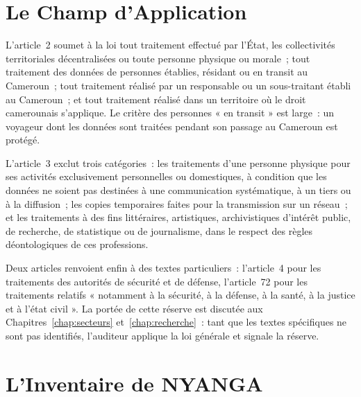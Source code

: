 \section{Le Champ d'Application}
\label{sec:c01-champ}

L'article~2 soumet à la loi tout traitement effectué par l'État, les
collectivités territoriales décentralisées ou toute personne physique ou
morale~; tout traitement des données de personnes établies, résidant ou en
transit au Cameroun~; tout traitement réalisé par un responsable ou un
sous-traitant établi au Cameroun~; et tout traitement réalisé dans un
territoire où le droit camerounais s'applique. Le critère des personnes
« en transit » est large~: un voyageur dont les données sont traitées
pendant son passage au Cameroun est protégé.

L'article~3 exclut trois catégories~: les traitements d'une personne
physique pour ses activités exclusivement personnelles ou domestiques, à
condition que les données ne soient pas destinées à une communication
systématique, à un tiers ou à la diffusion~; les copies temporaires faites
pour la transmission sur un réseau~; et les traitements à des fins
littéraires, artistiques, archivistiques d'intérêt public, de recherche,
de statistique ou de journalisme, dans le respect des règles
déontologiques de ces professions.

Deux articles renvoient enfin à des textes particuliers~: l'article~4 pour
les traitements des autorités de sécurité et de défense, l'article~72 pour
les traitements relatifs « notamment à la sécurité, à la défense, à la
santé, à la justice et à l'état civil ». La portée de cette réserve est
discutée aux Chapitres~\ref{chap:secteurs} et~\ref{chap:recherche}~: tant
que les textes spécifiques ne sont pas identifiés, l'auditeur applique la
loi générale et signale la réserve.

\section{L'Inventaire de NYANGA}
\label{sec:c01-nyanga}

